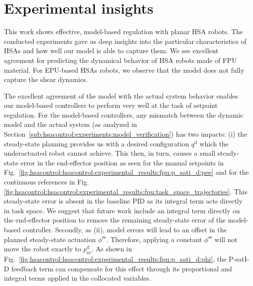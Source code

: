 \section{Experimental insights}
This work shows effective, model-based regulation with planar \gls{HSA} robots. The conducted experiments gave us deep insights into the particular characteristics of \glspl{HSA} and how well our model is able to capture them. We see excellent agreement for predicting the dynamical behavior of \gls{HSA} robots made of FPU material.
For EPU-based \glspl{HSA} robots, we observe that the model does not fully capture the shear dynamics.

The excellent agreement of the model with the actual system behavior enables our model-based controllers to perform very well at the task of setpoint regulation.
For the model-based controllers, any mismatch between the dynamic model and the actual system (as analyzed in Section~\ref{sub:hsacontrol:experiments:model_verification}) has two impacts: (i) the steady-state planning provides us with a desired configuration $q^\mathrm{d}$ which the underactuated robot cannot achieve. This then, in turn, causes a small steady-state error in the end-effector position as seen for the manual setpoints in Fig.~\ref{fig:hsacontrol:hsacontrol:experimental_results:fpu:p_sati_d:pee}
and for the continuous references in Fig.\ref{fig:hsacontrol:hsacontrol:experimental_results:fpu:task_space_trajectories}. This steady-state error is absent in the baseline PID as its integral term acts directly in task space. We suggest that future work include an integral term directly on the end-effector position to remove the remaining steady-state error of the model-based controller. Secondly, as (ii), model errors will lead to an offset in the planned steady-state actuation $\phi^\mathrm{ss}$. Therefore, applying a constant $\phi^\mathrm{ss}$ will not move the robot exactly to $p_\mathrm{ee}^\mathrm{d}$. As shown in Fig.~\ref{fig:hsacontrol:hsacontrol:experimental_results:fpu:p_sati_d:phi}, the P-satI-D feedback term can compensate for this effect through its proportional and integral terms applied in the collocated variables.

